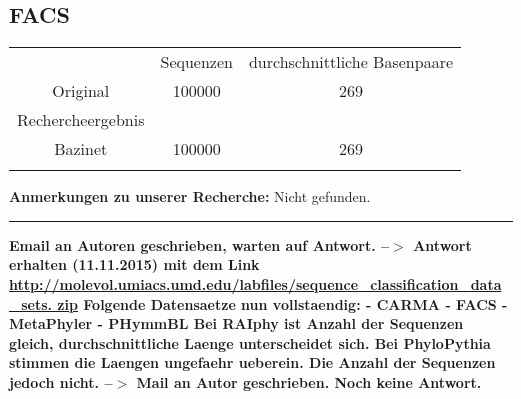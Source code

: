 \documentclass[a4paper, 11pt]{scrartcl}
\begin{document}
\begin{flushleft}
\subsection{FACS}
\begin{tabular}{ccc}
& Sequenzen & durchschnittliche Basenpaare \\
Original&100000&269\\
Rechercheergebnis&&\\
Bazinet&100000&269\\
&&\\
\end{tabular}
\linebreak
\color{red}
\textbf{Anmerkungen zu unserer Recherche:}\linebreak
Nicht gefunden. 
\linebreak
\linebreak
\noindent\rule{\textwidth}{1pt}
\newpage
\textbf{Email an Autoren geschrieben, warten auf Antwort. --$>$ Antwort erhalten (11.11.2015) mit dem Link \url{http://molevol.umiacs.umd.edu/labfiles/sequence_classification_data_sets.
zip} \linebreak
Folgende Datensaetze nun vollstaendig:\linebreak
- CARMA\linebreak
- FACS\linebreak
- MetaPhyler\linebreak
- PHymmBL\linebreak
Bei RAIphy ist Anzahl der Sequenzen gleich, durchschnittliche Laenge unterscheidet sich.\linebreak
Bei PhyloPythia stimmen die Laengen ungefaehr ueberein. Die Anzahl der Sequenzen jedoch nicht.\linebreak
--$>$ Mail an Autor geschrieben. Noch keine Antwort.}
\newpage


\end{flushleft}
\end{document}
